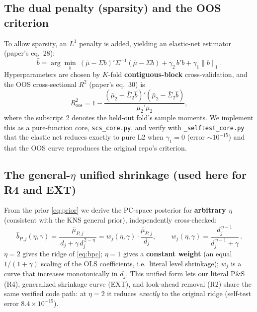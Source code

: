 \documentclass[11pt,a4paper]{article}
\newcommand{\Rtwo}{R^2}
\begin{document}
\subsection{The dual penalty (sparsity) and the OOS criterion}
To allow sparsity, an $L^1$ penalty is added, yielding an elastic-net estimator (paper's eq.~28):
\begin{equation}
  \hat b = \arg\min_b\ (\bar\mu-\Sigma b)'\Sigma^{-1}(\bar\mu-\Sigma b) + \gamma_2\,b'b + \gamma_1\|b\|_1 .
  \label{eq:enet}
\end{equation}
Hyperparameters are chosen by $K$-fold \textbf{contiguous-block} cross-validation, and the OOS cross-sectional
$\Rtwo$ (paper's eq.~30) is
\begin{equation}
  \Rtwo_{\text{oos}} = 1 - \frac{(\bar\mu_2-\bar\Sigma_2\hat b)'(\bar\mu_2-\bar\Sigma_2\hat b)}{\bar\mu_2'\bar\mu_2},
  \label{eq:r2oos}
\end{equation}
where the subscript 2 denotes the held-out fold's sample moments. We implement this as a pure-function core,
\texttt{scs\_core.py}, and verify with \texttt{\_selftest\_core.py} that the elastic net reduces exactly to pure
L2 when $\gamma_1{=}0$ (error $\sim10^{-15}$) and that the OOS curve reproduces the original repo's criterion.

\subsection{The general-$\eta$ unified shrinkage (used here for R4 and EXT)}\label{sec:general-eta}
From the prior \eqref{eq:prior} we derive the PC-space posterior for \textbf{arbitrary $\eta$} (consistent with the
KNS general prior), independently cross-checked:
\begin{equation}
  \hat b_{P,j}(\eta,\gamma) = \frac{\bar\mu_{P,j}}{\,d_j + \gamma\,d_j^{\,2-\eta}\,}
  = w_j(\eta,\gamma)\cdot\frac{\bar\mu_{P,j}}{d_j},\qquad
  \boxed{\,w_j(\eta,\gamma)=\frac{d_j^{\,\eta-1}}{d_j^{\,\eta-1}+\gamma}\,}.
  \label{eq:eta-weight}
\end{equation}
$\eta{=}2$ gives the ridge of \eqref{eq:bpc}; $\eta{=}1$ gives a \textbf{constant weight} (an equal $1/(1+\gamma)$
scaling of the OLS coefficients, i.e.\ literal level shrinkage); $w_j$ is a curve that increases monotonically in
$d_j$. This unified form lets our literal P\&S (R4), generalized shrinkage curve (EXT), and look-ahead removal (R2)
share the same verified code path: at $\eta{=}2$ it reduces \emph{exactly} to the original ridge (self-test error
$8.4\times10^{-15}$).
\end{document}
